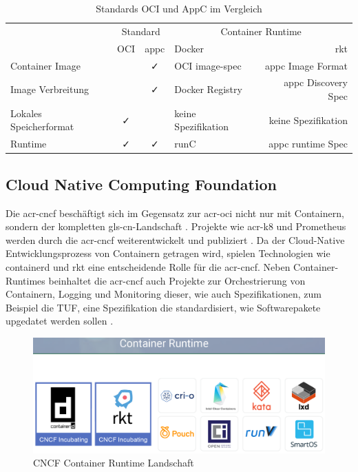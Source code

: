 \begin{table}[h]
	\begin{center}
		\begin{tabular}{lcclr}
			\toprule
			& \multicolumn{2}{c}{Standard} & \multicolumn{2}{c}{Container Runtime}\\
			\cmidrule{2-5}
			& OCI		& appc		& Docker			& rkt					\\
			\midrule
			Container Image			& \faTimes	& \faCheck	& OCI image-spec 	& appc Image Format		\\
			Image Verbreitung		& \faTimes	& \faCheck	& Docker Registry	& appc Discovery Spec 	\\
			Lokales Speicherformat	& \faCheck	& \faTimes	& keine Spezifikation& keine Spezifikation	\\
			\midrule
			Runtime					& \faCheck	& \faCheck	& runC 				& appc runtime Spec		\\
			\bottomrule
		\end{tabular}
	\end{center}
	\caption{Standards OCI und AppC im Vergleich \citep{MakingSenseofContainerStandardsandFoundations:OCICNCFAppcandRkt}}
	\label{tab:ociVSappc}
\end{table}


\subsection{Cloud Native Computing Foundation}
\label{sec:cncf}
Die \gls{acr-cncf} beschäftigt sich im Gegensatz zur \gls{acr-oci} nicht nur mit Containern, sondern der kompletten \gls{gls-cn}-Landschaft \citep{CNCFCloudNativeInteractiveLandscape}. Projekte wie \gls{acr-k8} und Prometheus werden durch die \gls{acr-cncf} weiterentwickelt und publiziert \cite{}. Da der Cloud-Native Entwicklungsprozess von Containern getragen wird, spielen Technologien wie containerd und rkt eine entscheidende Rolle für die \gls{acr-cncf}. Neben Container-Runtimes beinhaltet die \gls{acr-cncf} auch Projekte zur Orchestrierung von Containern, Logging und Monitoring dieser, wie auch Spezifikationen, zum Beispiel die TUF, eine Spezifikation die standardisiert, wie Softwarepakete upgedatet werden sollen \citep{CloudNativeComputingFoundation}.

\begin{figure}[H]
	\begin{center}
		\includegraphics[scale=0.3]{bilder/cncf-container-landscape.png}
		\caption{CNCF Container Runtime Landschaft \citep{CNCFCloudNativeInteractiveLandscape}}
		\label{fig:cncfContainerLandscape}
	\end{center}
\end{figure} 


